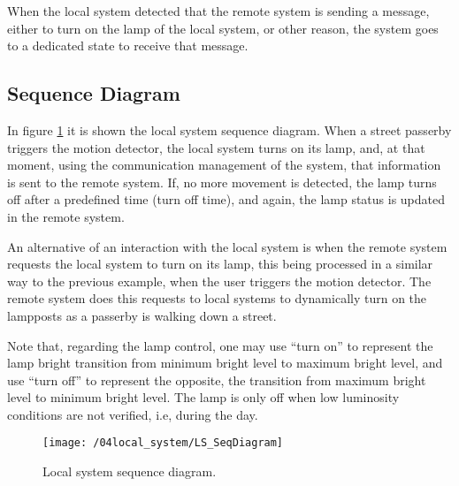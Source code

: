 When the local system detected that the remote system is sending a message, either to turn on the lamp of the local system, or other reason, the system goes to a dedicated state to receive that message.

\subsection{Sequence Diagram}
In figure \ref{fig:ls_seq_diagram} it is shown the local system sequence diagram. When a street passerby triggers the motion detector, the local system turns on its lamp, and, at that moment, using the communication management of the system, that information is sent to the remote system. If, no more movement is detected, the lamp turns off after a predefined time (turn off time), and again, the lamp status is updated in the remote system.

An alternative of an interaction with the local system is when the remote system requests the local system to turn on its lamp, this being processed in a similar way to the previous example, when the user triggers the motion detector. The remote system does this requests to local systems to dynamically turn on the lampposts as a passerby is walking down a street.

Note that, regarding the lamp control, one may use “turn on” to represent the lamp bright transition from minimum bright level to maximum bright level, and use “turn off” to represent the opposite, the transition from maximum bright level to minimum bright level. The lamp is only off when low luminosity conditions are not verified, i.e, during the day.

\begin{figure}[ht]
	\centering
	\texttt{[image: /04local\_system/LS\_SeqDiagram]}
	\caption{Local system sequence diagram.}
	\label{fig:ls_seq_diagram}
\end{figure}